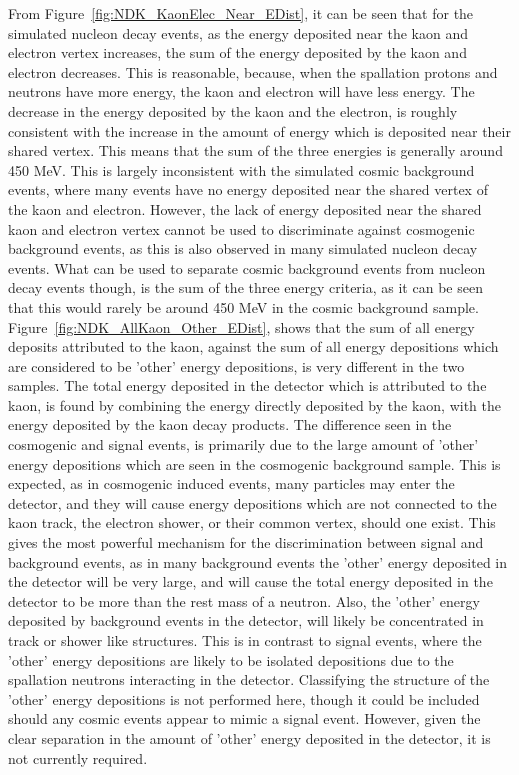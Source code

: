 From Figure~\ref{fig:NDK_KaonElec_Near_EDist}, it can be seen that for the simulated nucleon decay events, as the energy deposited near the kaon and electron vertex increases, the sum of the energy deposited by the kaon and electron decreases. This is reasonable, because, when the spallation protons and neutrons have more energy, the kaon and electron will have less energy. The decrease in the energy deposited by the kaon and the electron, is roughly consistent with the increase in the amount of energy which is deposited near their shared vertex. This means that the sum of the three energies is generally around 450 MeV. This is largely inconsistent with the simulated cosmic background events, where many events have no energy deposited near the shared vertex of the kaon and electron. However, the lack of energy deposited near the shared kaon and electron vertex cannot be used to discriminate against cosmogenic background events, as this is also observed in many simulated nucleon decay events. What can be used to separate cosmic background events from nucleon decay events though, is the sum of the three energy criteria, as it can be seen that this would rarely be around 450 MeV in the cosmic background sample. \\

Figure~\ref{fig:NDK_AllKaon_Other_EDist}, shows that the sum of all energy deposits attributed to the kaon, against the sum of all energy depositions which are considered to be 'other' energy depositions, is very different in the two samples. The total energy deposited in the detector which is attributed to the kaon, is found by combining the energy directly deposited by the kaon, with the energy deposited by the kaon decay products. The difference seen in the cosmogenic and signal events, is primarily due to the large amount of 'other' energy depositions which are seen in the cosmogenic background sample. This is expected, as in cosmogenic induced events, many particles may enter the detector, and they will cause energy depositions which are not connected to the kaon track, the electron shower, or their common vertex, should one exist. This gives the most powerful mechanism for the discrimination between signal and background events, as in many background events the 'other' energy deposited in the detector will be very large, and will cause the total energy deposited in the detector to be more than the rest mass of a neutron. Also, the 'other' energy deposited by background events in the detector, will likely be concentrated in track or shower like structures. This is in contrast to signal events, where the 'other' energy depositions are likely to be isolated depositions due to the spallation neutrons interacting in the detector. Classifying the structure of the 'other' energy depositions is not performed here, though it could be included should any cosmic events appear to mimic a signal event. However, given the clear separation in the amount of 'other' energy deposited in the detector, it is not currently required. \\

